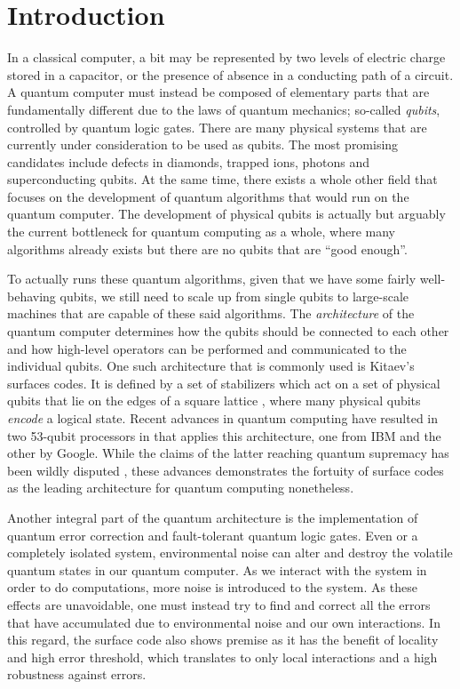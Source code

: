 \chapter{Introduction}

In a classical computer, a bit may be represented by two levels of electric charge stored in a capacitor, or the presence of absence in a conducting path of a circuit. A quantum computer must instead be composed of elementary parts that are fundamentally different due to the laws of quantum mechanics; so-called \emph{qubits}, controlled by quantum logic gates. There are many physical systems that are currently under consideration to be used as qubits. The most promising candidates include defects in diamonds, trapped ions, photons and superconducting qubits. At the same time, there exists a whole other field that focuses on the development of quantum algorithms that would run on the quantum computer. The development of physical qubits is actually but arguably the current bottleneck for quantum computing as a whole, where many algorithms already exists but there are no qubits that are ``good enough''.

To actually runs these quantum algorithms, given that we have some fairly well-behaving qubits, we still need to scale up from single qubits to large-scale machines that are capable of these said algorithms. The \emph{architecture} of the quantum computer determines how the qubits should be connected to each other and how high-level operators can be performed and communicated to the individual qubits. One such architecture that is commonly used is Kitaev's surfaces codes. It is defined by a set of stabilizers which act on a set of physical qubits that lie on the edges of a square lattice \cite{dennis2002topological}, where many physical qubits \emph{encode} a logical state. Recent advances in quantum computing have resulted in two 53-qubit processors in that applies this architecture, one from IBM and the other by Google. While the claims of the latter reaching quantum supremacy has been wildly disputed \cite{arute2019quantum}, these advances demonstrates the fortuity of surface codes as the leading architecture for quantum computing nonetheless.   

Another integral part of the quantum architecture is the implementation of quantum error correction and fault-tolerant quantum logic gates. Even or a completely isolated system, environmental noise can alter and destroy the volatile quantum states in our quantum computer. As we interact with the system in order to do computations, more noise is introduced to the system. As these effects are unavoidable, one must instead try to find and correct all the errors that have accumulated due to environmental noise and our own interactions. In this regard, the surface code also shows premise as it has the benefit of locality and high error threshold, which translates to only local interactions and a high robustness against errors. 

